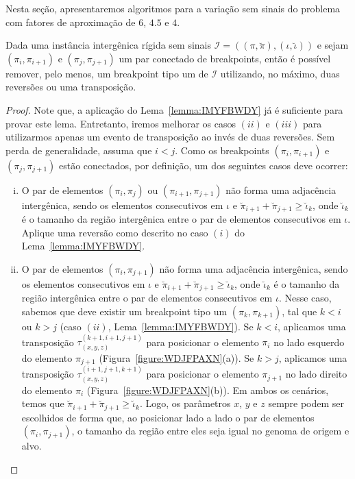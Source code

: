 Nesta seção, apresentaremos algoritmos para a variação sem sinais do problema \SbIRT{} com fatores de aproximação de $6$, $4.5$ e $4$.


\begin{lemma}\label{lemma:SIAFJFDO}
Dada uma instância intergênica rígida sem sinais $\mathcal{I}=((\pi,\breve\pi),(\iota,\breve\iota))$ e sejam $(\pi_i,\pi_{i+1})$ e $(\pi_j,\pi_{j+1})$ um par conectado de breakpoints, então é possível remover, pelo menos, um breakpoint tipo um de $\mathcal{I}$ utilizando, no máximo, duas reversões ou uma transposição.
\end{lemma}
\begin{proof}
Note que, a aplicação do Lema~\ref{lemma:IMYFBWDY} já é suficiente para provar este lema. Entretanto, iremos melhorar os casos $(ii)$ e $(iii)$ para utilizarmos apenas um evento de transposição ao invés de duas reversões. Sem perda de generalidade, assuma que $i < j$. Como os breakpoints $(\pi_i,\pi_{i+1})$ e $(\pi_j,\pi_{j+1})$ estão conectados, por definição, um dos seguintes casos deve ocorrer:
\begin{enumerate}[i.]
  \item O par de elementos $(\pi_i,\pi_{j})$ ou $(\pi_{i+1},\pi_{j+1})$ não forma uma adjacência intergênica, sendo os elementos consecutivos em $\iota$ e $\breve\pi_{i+1} + \breve\pi_{j+1} \ge \breve\iota_k$, onde $\breve\iota_k$ é o tamanho da região intergênica entre o par de elementos consecutivos em $\iota$. Aplique uma reversão como descrito no caso $(i)$ do Lema~\ref{lemma:IMYFBWDY}.
  \item O par  de elementos $(\pi_i,\pi_{j+1})$ não forma uma adjacência intergênica, sendo os elementos consecutivos em $\iota$ e $\breve\pi_{i+1} + \breve\pi_{j+1} \ge \breve\iota_k$, onde $\breve\iota_k$ é o tamanho da região intergênica entre o par de elementos consecutivos em $\iota$. Nesse caso, sabemos que deve existir um breakpoint tipo um $(\pi_k, \pi_{k+1})$, tal que $k <i$ ou $k > j$ (caso $(ii)$, Lema~\ref{lemma:IMYFBWDY}). Se $k < i$, aplicamos uma transposição $\tau^{(k+1,i+1,j+1)}_{(x,y,z)}$ para posicionar o elemento $\pi_{i}$ no lado esquerdo do elemento $\pi_{j+1}$ (Figura~\ref{figure:WDJFPAXN}(a)). Se $k > j$, aplicamos uma transposição $\tau^{(i+1,j+1,k+1)}_{(x,y,z)}$ para posicionar o elemento $\pi_{j+1}$ no lado direito do elemento $\pi_{i}$ (Figura~\ref{figure:WDJFPAXN}(b)). Em ambos os cenários, temos que $\breve\pi_{i+1} + \breve\pi_{j+1} \ge \breve\iota_k$. Logo, os parâmetros $x$, $y$ e $z$ sempre podem ser escolhidos de forma que, ao posicionar lado a lado o par de elementos $(\pi_i,\pi_{j+1})$, o tamanho da região entre eles seja igual no genoma de origem e alvo.

\end{enumerate}
\end{proof}
